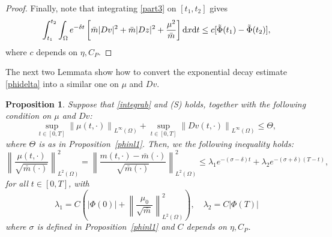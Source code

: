 \documentclass[10pt,a4paper,nouppercase,nowrite]{article}
\numberwithin{equation}{section}
\newcommand{\di}{{\rm d}}
\newcommand{\Sp}{{\textsc (S)} }
\newtheorem{prop}[defn]{Proposition}
\theoremstyle{definition}
\begin{document}
\begin{proof}
		Finally, note that integrating \eqref{part3} on $[t_1,t_2]$ gives
		\begin{equation}\label{nuovaint}
		\int_{t_1}^{t_2} \int_{\Omega} e^{-\delta t} \left[\bar{m} |Dv|^2+  \bar{m} |Dz|^2+  \frac{\mu^2}{\bar{m}}\right] \di x \di t \le c [\tilde{\Phi}(t_1)-  \tilde{\Phi}(t_2)],
		\end{equation}
		where $c$ depends on $\eta, C_P$.
	\end{proof}
	
	The next two Lemmata show how to convert the exponential decay estimate \eqref{phidelta} into a similar one on $\mu$ and $Dv$.
	
	\begin{prop}\label{phinl2}
		Suppose that \eqref{integrab} and \Sp holds, together with the following condition on $\mu$ and $Dv$:
		\begin{equation*}
			\sup_{t \in [0,T]} \left \| \mu(t,\cdot) \right \|_{L^\infty(\Omega)} + \sup_{t \in [0,T]} \left \| Dv(t,\cdot) \right\|_{L^\infty(\Omega)} \le \Theta,
		\end{equation*}
		where $\Theta$ is as in Proposition~\ref{phinl1}.
		Then, we the following inequality holds:
		\begin{equation*}
			\left \| \frac{\mu(t,\cdot)}{\sqrt{\bar{m}(\cdot)}}\right \|^2_{L^2(\Omega)} = \left \| \frac{m(t,\cdot)-\bar{m}(\cdot)}{\sqrt{\bar{m}(\cdot)}} \right \|^2_{L^2(\Omega)} \le \lambda_1 e^{-(\sigma-\delta) t} + \lambda_2 e^{-(\sigma+\delta) (T-t)},
		\end{equation*}
		for all $t \in [0,T]$, with
		$$\lambda_1 = C\left(|\Phi(0)|+ \left\| \frac{\mu_0}{\sqrt{\bar{m}}} \right\|_{L^2(\Omega)}^2 \right), \quad \lambda_2 = C|\Phi(T)|$$
		\label{L2mu}
		where $\sigma$ is defined in Proposition~\ref{phinl1} and $C$ depends on $\eta, C_P$.
	\end{prop}
\end{document}

